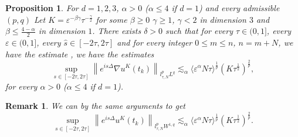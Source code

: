 \documentclass[10pt,a4paper]{article}
\newtheorem{proposition}[theorem]{Proposition}
\newtheorem{remark}[theorem]{Remark}
\begin{document}

  

  \begin{proposition}\label{DuKlpLq}
    For \(d=1,2,3\), \(\alpha>0\) (\(\alpha \leq 4\) if \(d=1\)) and every
    admissible \((p,q)\)
    Let \(K = \varepsilon^{-\beta\gamma}\tau^{-\frac\gamma2}\) for some
    \(\beta\geq0\) \(\gamma\geq1\), \(\gamma<2\) in dimension \(3\) and \(\beta
    \leq \frac{4-\alpha}2\) in dimension \(1\). There exists \(\delta>0\)
    such that for every \( \tau \in (0,1] \), every \(\varepsilon \in (0,1]\), 
    every \(\hat{s} \in [-2\tau,2\tau] \) and for every integer 
    \(0 \leq m \leq n \), \(n=m+N\), we have the estimate
    , we have the estimates
    \begin{equation}
       \sup_{s\in[-2\tau,2\tau]} \left\|e^{is\Delta}\nabla u^K(t_k)\right\|_{l^p_{\tau,N}L^q}
       \lesssim_\alpha \langle\varepsilon^\alpha N\tau\rangle^\frac1p (K\tau^\frac12)^\frac2p,
    \end{equation}
    for every \(\alpha>0\) (\(\alpha\leq4\) if \(d=1\)).
  \end{proposition}
  \begin{remark}
    We can by the same arguments to get 
    \begin{equation}
      \sup_{s\in[-2\tau,2\tau]} \left\|e^{is\Delta}u^K(t_k)\right\|_{l^p_{\tau,N}W^{1,q}}
      \lesssim_\alpha \langle\varepsilon^\alpha N\tau\rangle^\frac1p (K\tau^\frac12)^\frac2p.
    \end{equation}
  \end{remark}
\end{document}
